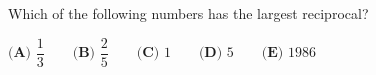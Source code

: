 Which of the following numbers has the largest reciprocal?

$\textbf{(A) }\dfrac13\qquad\textbf{(B) }\dfrac25\qquad\textbf{(C) }1\qquad\textbf{(D) }5\qquad\textbf{(E) }1986$
